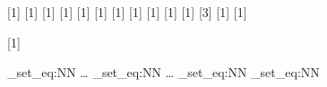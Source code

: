 \newtextcommand{\color}
\newtextcommand{\bgcolor}
\newtextcommand{\displaystyle}
\newtextcommand{\textstyle}
\newtextcommand{\textsize}
\newtextcommand{\scriptsize}
\let\scriptstyle=\scriptsize
\newtextcommand{\scriptscriptsize}
\let\scriptscriptstyle=\scriptscriptsize
\newtextcommand{\mathit}[1]
\newtextcommand{\boldsymbol}
\newtextcommand{\mathbf}[1]
\newtextcommand{\mathrm}[1]
\newtextcommand{\mathbb}[1]
\newtextcommand{\mathfrak}[1]
\newtextcommand{\mathfr}[1]
\newtextcommand{\slash}[1]
\newtextcommand{\boxed}[1]
\newtextcommand{\mathcal}[1]
\newtextcommand{\substack}[1]
\newtextcommand{\arrayopts}[1]
\newtextcommand{\colalign}
\newtextcommand{\collayout}
\newtextcommand{\rowalign}
\newtextcommand{\equalrows}
\newtextcommand{\equalcols}
\newtextcommand{\rowlines}
\newtextcommand{\collines}
\newtextcommand{\frame}
\newtextcommand{\padding}
\newtextcommand{\rowopts}
\newtextcommand{\cellopts}
\newtextcommand{\rowspan}
\newtextcommand{\colspan}
\newtextcommand{\medspace}
\newtextcommand{\thickspace}
\newtextcommand{\negspace}
\newtextcommand{\operatorname}
\newtextcommand{\mathop}
\newtextcommand{\mathbin}
\newtextcommand{\mathrel}
\newtextcommand{\text}
\newtextcommand[\array]{\itexarray}
\newtextcommand[\align]{\itexalign}
\newtextcommand[\space]{\itexspace}[3]
\newtextcommand[]{\itexgroup}[1]
\newtextcommand[\text]{\textrm}[1]
\newtextcommand[\\]{\itexnl}

[1]

\newtextcommand*{\!}
\newtextcommand*{\|}
\newtextcommand*{\:}
\newtextcommand*{\;}
\itexmathscommand{\,}

\cs_set_eq:NN \dotsc \dots
\cs_set_eq:NN \dotsb \dots
\cs_set_eq:NN \land \wedge
\cs_set_eq:NN \lor \vee

\endinput

